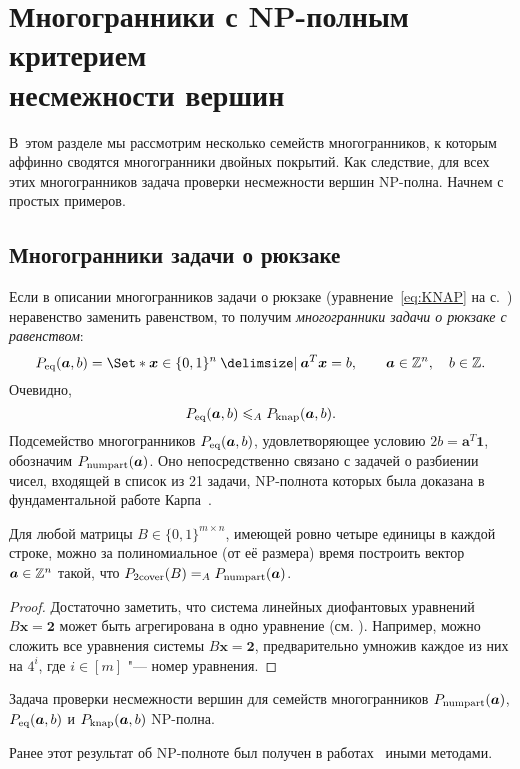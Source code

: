 %
%

\section[Многогранники с NP-полным критерием несмежности вершин]{Многогранники с NP-полным критерием\\ несмежности вершин}
\label{sec:PolytopesWithNPadj}

В~этом разделе мы рассмотрим несколько семейств многогранников, к которым аффинно сводятся многогранники двойных покрытий.
Как следствие, для всех этих многогранников задача проверки несмежности вершин NP-полна.
Начнем с простых примеров.

\subsection{Многогранники задачи о рюкзаке}

Если в описании многогранников задачи о рюкзаке (уравнение~\eqref{eq:KNAP} на с.~\pageref{eq:KNAP}) неравенство заменить равенством, то получим \emph{многогранники задачи о рюкзаке с равенством}:
\begin{equation}
\label{eq:KnapEq}
\KnapEq(\bm{a},b) = \Set*{\bm{x} \in \{0,1\}^{n} \given \bm{a}^T \bm{x} = b}, \qquad \bm{a} \in \Z^n,\quad b \in \Z.
\end{equation}
Очевидно,
\[
P_{\textup{eq}}(\bm{a},b) \leqslant_A P_{\textup{knap}}(\bm{a},b).
\]
Подсемейство многогранников $P_{\textup{eq}}(\bm{a},b)$, удовлетворяющее условию $2b = \bm{a}^T \bm{1}$, обозначим $P_{\textup{numpart}}(\bm{a})$.
Оно непосредственно связано с задачей о разбиении чисел, входящей в список из 21 задачи, NP-полнота которых была доказана в фундаментальной работе Карпа~\cite{Karp:1972}.

\begin{theorem}
Для любой матрицы $B \in \{0,1\}^{m\times n}$, имеющей ровно четыре единицы в каждой строке, можно за полиномиальное (от её размера) время построить вектор $\bm{a} \in \mathbb{Z}^n$ такой, %
что $P_{\textup{2cover}}(B) =_A P_{\textup{numpart}}(\bm{a})$.
\end{theorem}
\begin{proof}\sloppy
Достаточно заметить, что система линейных диофантовых уравнений $B \bm{x} = \bm{2}$ может быть агрегирована в одно уравнение (см. \cite{Padberg:1972, Kovalev:1977}).
Например, можно сложить все уравнения системы $B \bm{x} = \bm{2}$, предварительно умножив каждое из них на $4^i$, где $i\in[m]$ "--- номер уравнения.
\end{proof}
\begin{corollary}
Задача проверки несмежности вершин для семейств многогранников $P_{\textup{numpart}}(\bm{a})$, $P_{\textup{eq}}(\bm{a},b)$ и $P_{\textup{knap}}(\bm{a},b)$ NP-полна.
\end{corollary}
Ранее этот результат об NP-полноте был получен в работах~\cite{Chung:1980,Geist:1992,Matsui:1995} иными методами.


